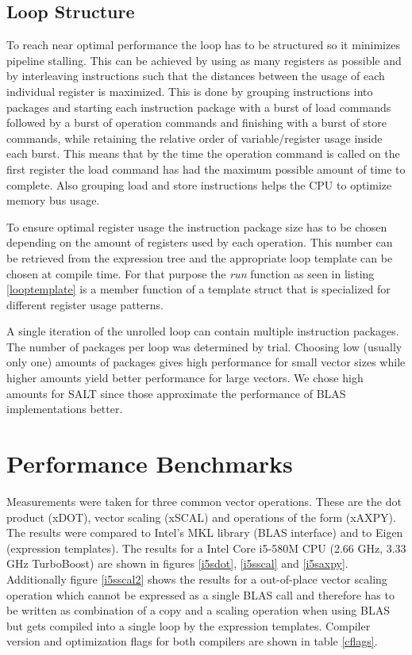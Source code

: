 \documentclass[12pt]{article}
\begin{document}
\subsection{Loop Structure}
To reach near optimal performance the loop has to be structured so it minimizes
pipeline stalling. This can be achieved by using as many registers as possible
and by interleaving instructions such that the distances between the usage of
each individual register is maximized. This is done by grouping instructions into packages
and starting each instruction package with a burst of load commands followed by a burst of operation commands and
finishing with a burst of store commands, while retaining the relative order of
variable/register usage inside each burst. This means that by the time the
operation command is called on the first register the load command has had the maximum
possible amount of time to complete. Also grouping load and store instructions
helps the CPU to optimize memory bus usage.

To ensure optimal register usage the instruction package size has to be chosen depending
on the amount of registers used by each operation. This number can be retrieved
from the expression tree and the appropriate loop template can be chosen at compile
time. For that purpose the \emph{run} function as seen in listing \ref{looptemplate}
is a member function of a template struct that is specialized for different
register usage patterns.

A single iteration of the unrolled loop can contain multiple instruction packages.
The number of packages per loop was determined by trial. Choosing low (usually
only one) amounts of packages gives high performance for small vector sizes while
higher amounts yield better performance for large vectors. We chose high amounts for SALT
since those approximate the performance of BLAS implementations better.

\section{Performance Benchmarks}
Measurements were taken for three common vector operations. These are the dot product
(xDOT), vector scaling (xSCAL) and operations of the form 
(xAXPY). The results were compared to Intel's MKL library (BLAS interface) and
to Eigen (expression templates). The results for a Intel Core i5-580M CPU (2.66 GHz,
3.33 GHz TurboBoost) are shown in figures \ref{i5sdot}, \ref{i5sscal} and \ref{i5saxpy}.
Additionally figure \ref{i5sscal2} shows the results for a out-of-place vector
scaling operation which cannot be expressed as a single BLAS call and therefore
has to be written as combination of a copy and a scaling operation when using BLAS
but gets compiled into a single loop by the expression templates.
Compiler version and optimization flags for both compilers are shown in table \ref{cflags}.
\end{document}
